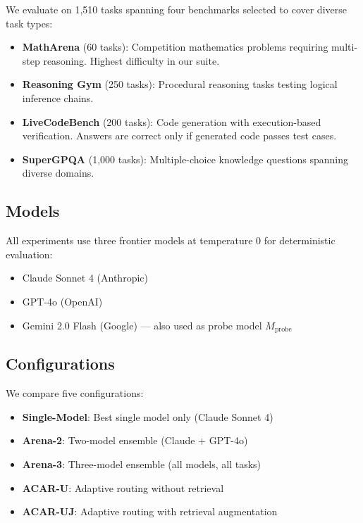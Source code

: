 \documentclass{article}
\newcommand{\acar}{\textsc{ACAR}}
\begin{document}
We evaluate on 1,510 tasks spanning four benchmarks selected to cover diverse task types:

\begin{itemize}[leftmargin=*, itemsep=2pt]
    \item \textbf{MathArena} (60 tasks): Competition mathematics problems requiring multi-step reasoning. Highest difficulty in our suite.
    \item \textbf{Reasoning Gym} (250 tasks): Procedural reasoning tasks testing logical inference chains.
    \item \textbf{LiveCodeBench} (200 tasks): Code generation with execution-based verification. Answers are correct only if generated code passes test cases.
    \item \textbf{SuperGPQA} (1,000 tasks): Multiple-choice knowledge questions spanning diverse domains.
\end{itemize}

\subsection{Models}

All experiments use three frontier models at temperature 0 for deterministic evaluation:
\begin{itemize}[leftmargin=*, itemsep=1pt]
    \item Claude Sonnet 4 (Anthropic)
    \item GPT-4o (OpenAI)
    \item Gemini 2.0 Flash (Google) --- also used as probe model $M_{\text{probe}}$
\end{itemize}

\subsection{Configurations}

We compare five configurations:
\begin{itemize}[leftmargin=*, itemsep=1pt]
    \item \textbf{Single-Model}: Best single model only (Claude Sonnet 4)
    \item \textbf{Arena-2}: Two-model ensemble (Claude + GPT-4o)
    \item \textbf{Arena-3}: Three-model ensemble (all models, all tasks)
    \item \textbf{\acar{}-U}: Adaptive routing without retrieval
    \item \textbf{\acar{}-UJ}: Adaptive routing with retrieval augmentation
\end{itemize}
\end{document}

